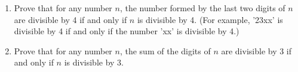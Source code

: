 
\begin{enumerate}
\item Prove that for any number $n$, the number formed by the last two digits of $n$ are divisible by 4 if and only if $n$ is divisible by 4. (For example, '23xx' is divisible by 4 if and only if the number 'xx' is divisible by 4.)
\item Prove that for any number $n$, the sum of the digits of $n$ are divisible by 3 if and only if $n$ is divisible by 3.
\end{enumerate}